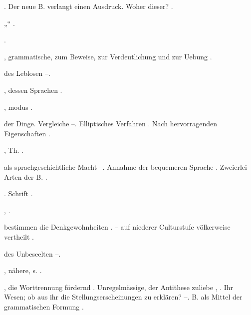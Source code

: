 \begin{register}
. Der neue B. verlangt einen Ausdruck. Woher dieser? \pageref{sp.230}.

„“ \pageref{sp.45}.

 \pageref{sp.231}.

, grammatische, zum Beweise, zur Verdeutlichung und zur Uebung \pageref{sp.116}.

 des Leblosen \pageref{sp.315}–\pageref{sp.317}.


, dessen Sprachen \pageref{sp.54}.

, modus \pageref{sp.114}.

 der Dinge. Vergleiche \pageref{sp.40}–\pageref{sp.43}. Elliptisches Verfahren \pageref{sp.366}. Nach hervorragenden Eigenschaften \pageref{sp.381}.

, Th. \sed{\pageref{sp.252},} \pageref{sp.295}.



 als sprachgeschichtliche Macht \pageref{sp.181}–\pageref{sp.185}\sed{, \pageref{sp.256}}. Annahme der bequemeren Sprache \pageref{sp.262}. Zweierlei Arten der B. \pageref{sp.429}.

. Schrift \pageref{sp.131}.

 \pageref{sp.142}, \pageref{sp.160}\sed{, \pageref{sp.299}}. 



 bestimmen die Denkgewohnheiten \pageref{sp.44}. – auf niederer Culturstufe völkerweise vertheilt \pageref{sp.44}.

 des Unbeseelten \pageref{sp.315}–\pageref{sp.317}.

, nähere, s. .

, die Worttrennung fördernd \pageref{sp.132}. Unregelmässige, der Antithese zuliebe \pageref{sp.227}, \pageref{sp.375}. Ihr Wesen; ob aus ihr die Stellungserscheinungen zu erklären? \pageref{sp.373}–\pageref{sp.376}. B. als Mittel der grammatischen Formung \pageref{sp.451}.


\end{register}
